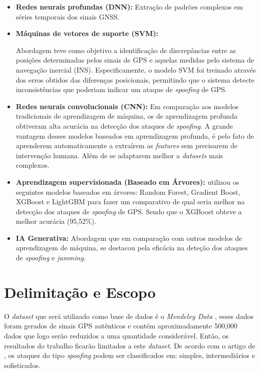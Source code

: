\documentclass[12pt]{article}
\begin{document}
\begin{itemize}
    \item \textbf{Redes neurais profundas (DNN):}
     Extração de padrões complexos em séries temporais dos sinais GNSS.
     \cite{isleyenGPSSpoofingDetection2024}

    \item \textbf{Máquinas de vetores de suporte (SVM):}

     Abordagem teve como objetivo a identificação
     de discrepâncias entre as posições determinadas pelos sinais de GPS
     e aquelas medidas pelo sistema de navegação inercial (INS).
     Especificamente, o modelo SVM foi treinado através dos erros obtidos
     das diferenças posicionais,
     permitindo que o sistema detecte inconsistências que poderiam
     indicar um ataque de \textit{spoofing} de GPS.
     \cite{panice2017}
    
    \item \textbf{Redes neurais convolucionais (CNN):} Em comparação
    aos modelos tradicionais de aprendizagem de máquina,
    os de aprendizagem profunda obtiveram alta acurácia na detecção dos
    ataques de \textit{spoofing}.
    A grande vantagem desses modelos baseados em aprendizagem profunda,
    é pelo fato de aprenderem automaticamente a extraírem as \textit{features}
    sem precisarem de intervenção humana. Além de se adaptarem melhor a \textit{datasets}
    mais complexos. \cite{cnn2023}

    
    \item \textbf{Aprendizagem supervisionada (Baseado em Árvores):}
    \textcite{Aissou2021} utilizou os seguintes modelos baseados
     em árvores: Random Forest, Gradient Boost, XGBoost e LightGBM
     para fazer um comparativo de qual seria melhor na detecção dos ataques
     de \textit{spoofing} de GPS. Sendo que o XGBoost obteve a melhor acurácia (95,52\%).

    \item \textbf{IA Generativa:}  Abordagem que em comparação com outros
    modelos de aprendizagem de máquina, se destacou pela eficácia
    na deteção dos ataques de \textit{spoofing} e \textit{jamming}.
    \cite{elalamiDroneDefGANtGenerativeAIBased2024}
    
\end{itemize}



\section{Delimitação e Escopo}
O \textit{dataset} que será utilizado como base de dados é o \textit{Mendeley Data} 
\cite{aissou2022dataset}, esses dados foram gerados de sinais GPS autênticos e 
contém aproximadamente 500,000 dados que logo serão reduzidos a uma quantidade
considerável. Então, os resultados do trabalho ficarão
limitados a este \textit{dataset}. De acordo com o artigo de \cite{Aissou2021}, os ataques do tipo \textit{spoofing} podem ser classificados em: simples, intermediários e sofisticados.
\end{document}
